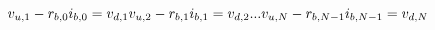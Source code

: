 \documentclass[10pt]{article}
\begin{document}
\[\hspace{-15pt}v_{u,1} - r_{b,0} i_{b,0} = v_{d,1} \\
v_{u,2} - r_{b,1} i_{b,1} = v_{d,2} \\
...\\
v_{u,N} - r_{b,N-1} i_{b,N-1} = v_{d,N} \\
\]
\end{document}

